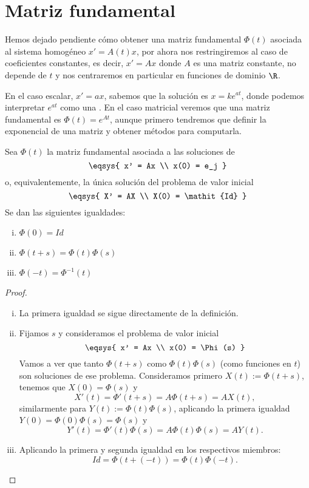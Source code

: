 \documentclass[../ecuaciones_diferenciales.tex]{subfiles}
\begin{document}
\section{Matriz fundamental}

Hemos dejado pendiente cómo obtener una matriz fundamental \(\Phi(t)\) asociada
al sistema homogéneo \(x' = A(t)x\), por ahora nos restringiremos al caso de
coeficientes constantes, es decir, \(x' = Ax\) donde \(A\) es una matriz
constante, no depende de \(t\) y nos centraremos en particular en funciones de
dominio \(\R\).

En el caso escalar, \(x' = ax\), sabemos que la solución es \(x = ke^{at}\),
donde podemos interpretar \(e^{at}\) como una . En el caso matricial veremos que una matriz fundamental es
\(\Phi(t) = e^{At}\), aunque primero tendremos que definir la exponencial de una
matriz y obtener métodos para computarla.

\begin{lemma}
	\label{lem:expphi}
	Sea \(\Phi(t)\) la matriz fundamental asociada a las soluciones de
	\[\eqsys{
			x' = Ax \\
			x(0) = e_j
		}\]
	o, equivalentemente, la única solución del problema de valor inicial
	\[\eqsys{
			X' = AX \\
			X(0) = \mathit{Id}
		}\]
	Se dan las siguientes igualdades:
	\begin{multicols}{3}
		\begin{enumerate}[i)]
			\item \(\displaystyle \Phi(0) = \mathit{Id}\)
			\item \(\displaystyle \Phi(t + s) = \Phi(t) \Phi(s)\)
			\item \(\displaystyle \Phi(-t) = \Phi^{-1}(t)\)
		\end{enumerate}
	\end{multicols}
\end{lemma}

\begin{proof}
	\begin{enumerate}[i), wide, labelwidth=0pt, labelindent=0pt]
		\item La primera igualdad se sigue directamente de la definición.
		\item Fijamos \(s\) y consideramos el problema de valor inicial
		      \[\eqsys{ x' = Ax \\ x(0) = \Phi(s) }\]
		      Vamos a ver que tanto \(\Phi(t + s)\) como \(\Phi(t)\Phi(s)\) (como
		      funciones en \(t\)) son soluciones de ese problema. Consideramos
		      primero \(X(t) := \Phi(t + s)\), tenemos que \(X(0) = \Phi(s)\) y
		      \[X'(t) = \Phi'(t + s) = A \Phi(t + s) = A X(t),\]
		      similarmente para \(Y(t) := \Phi(t)\Phi(s)\), aplicando la primera
		      igualdad \(Y(0) = \Phi(0)\Phi(s) = \Phi(s)\) y
		      \[Y'(t) = \Phi'(t)\Phi(s) = A \Phi(t)\Phi(s) = A Y(t).\]
		\item Aplicando la primera y segunda igualdad en los respectivos
		      miembros:
		      \[\mathit{Id} = \Phi(t + (-t)) = \Phi(t)\Phi(-t).\]
	\end{enumerate}
\end{proof}
\end{document}
